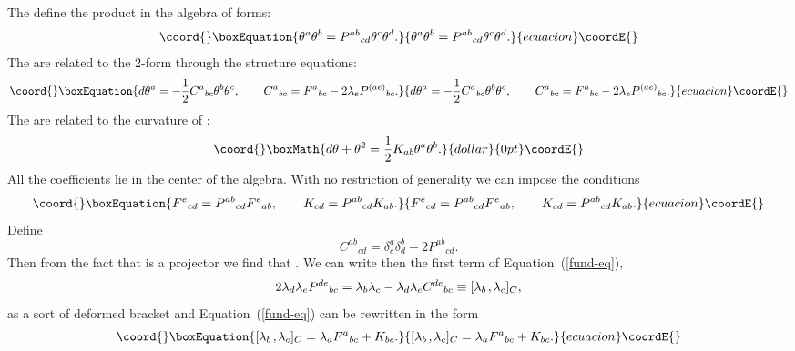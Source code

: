 \documentclass[a4paper,12pt]{article}
\def\c#1{{\cal #1}}
\def\k{\kern-.1em\mathbin{,}\kern-.1em}
\begin{document}
The \coordHE{} define the product in the algebra of forms:
\begin{equation}\coord{}\boxEquation{
\theta^a \theta^b = P^{ab}{}_{cd} \theta^c \theta^d.            \label{struc}
}{
\theta^a \theta^b = P^{ab}{}_{cd} \theta^c \theta^d.            }{ecuacion}\coordE{}\end{equation}
The \coordHE{} are related to the 2-form \coordHE{} through the
structure equations:
\begin{equation}\coord{}\boxEquation{
d\theta^a = - {1\over 2}C^a{}_{bc} \theta^b \theta^c, \qquad
C^a{}_{bc} = F^a{}_{bc} - 2 \lambda_e P^{(ae)}{}_{bc}.           \label{s-e}
}{
d\theta^a = - {1\over 2}C^a{}_{bc} \theta^b \theta^c, \qquad
C^a{}_{bc} = F^a{}_{bc} - 2 \lambda_e P^{(ae)}{}_{bc}.           }{ecuacion}\coordE{}\end{equation}
The \coordHE{} are related to the curvature of \myHighlight{$\theta$}\coordHE{}:
$$\coord{}\boxMath{
d\theta + \theta^2 = {1\over 2} K_{ab} \theta^a \theta^b.
}{dollar}{0pt}\coordE{}$$
All the coefficients lie in the center \myHighlight{$\c{Z}(\c{A})$}\coordHE{} of the
algebra.  With no restriction of generality we can impose the
conditions
\begin{equation}\coord{}\boxEquation{
F^e{}_{cd} = P^{ab}{}_{cd} F^e{}_{ab}, \qquad K_{cd} = 
P^{ab}{}_{cd} K_{ab}.                                           \label{F-P-K}
}{
F^e{}_{cd} = P^{ab}{}_{cd} F^e{}_{ab}, \qquad K_{cd} = 
P^{ab}{}_{cd} K_{ab}.                                           }{ecuacion}\coordE{}\end{equation}
Define
$$
C^{ab}{}_{cd} = \delta^a_c \delta^b_d - 2 P^{ab}{}_{cd}.       %
$$
Then from the fact that \coordHE{} is a projector we find that
\coordHE{}.  We can write
then the first term of Equation~(\ref{fund-eq}),
$$
2 \lambda_d \lambda_e P^{de}{}_{bc} = \lambda_b \lambda_c -
\lambda_d \lambda_e C^{de}{}_{bc} \equiv
[\lambda_b\k \lambda_c]_C,                                       %
$$
as a sort of deformed bracket and Equation~(\ref{fund-eq}) can be
rewritten in the form
\begin{equation}\coord{}\boxEquation{
[\lambda_b\k \lambda_c]_C = \lambda_a F^a{}_{bc} + K_{bc}.
\label{consis}
}{
[\lambda_b\k \lambda_c]_C = \lambda_a F^a{}_{bc} + K_{bc}.
}{ecuacion}\coordE{}\end{equation}
\end{document}

